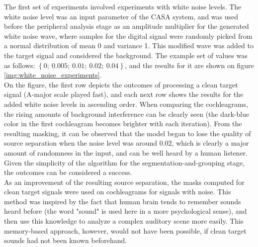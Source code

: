 The first set of experiments involved experiments with white noise levels. The white noise level was an input parameter of the CASA system, and was used before the peripheral analysis stage as an amplitude multiplier for the generated white noise wave, where samples for the digital signal were randomly picked from a normal distribution of mean 0 and variance 1. This modified wave was added to the target signal and considered the background. The example set of values was as follows: $\left\{0;~0.005;~0.01;~0.02;~0.04\right\}$, and the results for it are shown on figure \ref{img:white_noise_experiments}.\\

On the figure, the first row depicts the outcomes of processing a clean target signal (A-major scale played fast), and each next row shows the results for the added white noise levels in ascending order. When comparing the cochleagrams, the rising amounts of background interference can be clearly seen (the dark-blue color in the first cochleagram becomes brighter with each itera\-tion). From the resulting masking, it can be observed that the model began to lose the quality of source separation when the noise level was around $0.02$, which is clearly a major amount of randomness in the input, and can be well heard by a human listener. Given the simplicity of the algorithm for the segmentation-and-grouping stage, the outcomes can be considered a success.\\

As an improvement of the resulting source separation, the masks computed for clean target signals were used on cochleagrams for signals with noise. This method was inspired by the fact that human brain tends to remember sounds heard before (the word "sound" is used here in a more psychological sense), and then use this knowledge to analyze a complex auditory scene more easily. This memory-based approach, however, would not have been possible, if clean target sounds had not been known beforehand.


